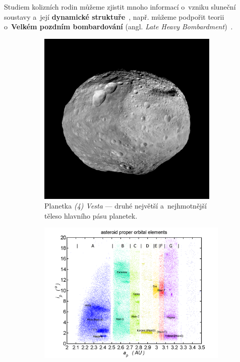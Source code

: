 \documentclass{beamer}
\newlength{\vyska}
\newlength{\vyskaA}
\newlength{\side}
\newlength{\main}
\newlength{\newparskip}
\begin{document}
\begin{frame}
\begin{columns}[t]
\begin{column}{\side}
\begin{tcolorbox}[title=Úvod\phantom{Úy},height=0.335\vyskaA,parbox=false]
		Studiem kolizních rodin můžeme zjistit mnoho informací o~vzniku sluneční soustavy a~její \textbf{dynamické struktuře}~\cite{nesvorny15}, např. můžeme podpořit teorii o~\textbf{Velkém pozdním bombardování} (angl. \textit{Late Heavy Bombardment})~\cite{broz13}.%
		\begin{figure}[!htb]
			\begin{subfigure}[t]{0.44\textwidth}
			\centering
			\includegraphics[width=0.95\textwidth]{../obr/vesta.jpg}
			\caption{Planetka \textit{(4) Vesta} --- druhé největší a~nejhmotnější těleso hlavního pásu planetek.} \label{fig:vesta}
			\end{subfigure}
			\begin{subfigure}[t]{0.55\textwidth}
			\centering
			\includegraphics[width=1.0\textwidth]{../obr/mainbelt.png}

\end{subfigure}
\end{figure}
\end{tcolorbox}
\end{column}
\end{columns}
\end{frame}
\end{document}
